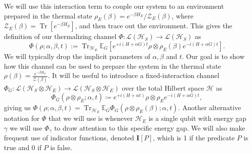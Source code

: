\documentclass[
 amsmath,amssymb,
 aps,
onecolumn, 
nofootinbib]{revtex4-2}
\newcommand{\brackets}[1]{\left[ #1 \right]}
\DeclareMathOperator{\Tr}{Tr}
\newcommand{\trace}[1]{\Tr \brackets{ #1 }}
\newcommand{\hilb}{\mathcal{H}}
\newcommand{\partfun}{\mathcal{Z}}
\begin{document}
We will use this interaction term to couple our system to an environment prepared in the thermal state $\rho_E(\beta) = e^{-\beta H_E} /\partfun_E(\beta)$, where $\partfun_E(\beta) = \trace{e^{-\beta H_E}}$, and then trace out the environment. This gives the definition of our thermalizing channel $\Phi : \mathcal{L}(\hilb_S) \to \mathcal{L}(\hilb_S)$ as
\begin{equation}\label{eq:PhiDef}
    \Phi(\rho ; \alpha, \beta, t) :=  \Tr_{\hilb_E} \mathbb{E}_{G} \left[ e^{+i(H + \alpha G)t} \rho \otimes \rho_E(\beta) e^{-i(H + \alpha G) t}\right]. 
\end{equation}
We will typically drop the implicit parameters of $\alpha, \beta$ and $t$. Our goal is to show how this channel can be used to prepare the system in the thermal state $\rho(\beta) = \frac{e^{-\beta H_S}}{\partfun(\beta)}$. It will be useful to introduce a fixed-interaction channel $\Phi_G : \mathcal{L}(\hilb_S \otimes \hilb_E) \to \mathcal{L}(\hilb_S \otimes \hilb_E)$ over the total Hilbert space $\hilb$ as 
\begin{equation}
    \Phi_G(\rho \otimes \rho_E; \alpha, t) \coloneqq e^{+i(H + \alpha t)} \rho \otimes \rho_E e^{- i(H + \alpha G)t}, \label{eq:phi_g_definition}
\end{equation}
giving us $\Phi(\rho; \alpha, \beta, t) = \Tr_{\hilb_E} \mathbb{E}_G \Phi_G(\rho \otimes \rho_E(\beta); \alpha, t)$. Another alternative notation for $\Phi$ that we will use is whenever $\hilb_E$ is a single qubit with energy gap $\gamma$ we will use $\Phi_\gamma$ to draw attention to this specific energy gap. We will also make frequent use of indicator functions, denoted $\mathbf{I}[P]$, which is 1 if the predicate $P$ is true and 0 if $P$ is false.
\end{document}

